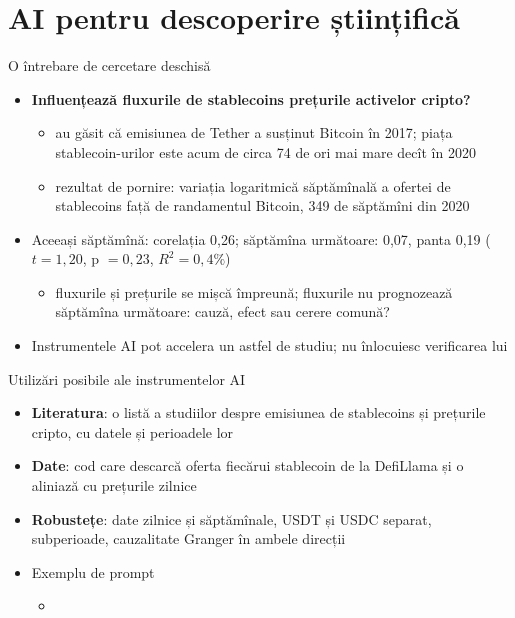 \section{AI pentru descoperire științifică}

\begin{frame}{O întrebare de cercetare deschisă}
\itemsize{\small}
\begin{itemize}
    \item \textbf{Influențează fluxurile de stablecoins prețurile activelor cripto?}
    \begin{itemize}
        \item {} au găsit că emisiunea de Tether a susținut Bitcoin în 2017; piața stablecoin-urilor este acum de circa 74 de ori mai mare decît în 2020
        \item rezultat de pornire: variația logaritmică săptămînală a ofertei de stablecoins față de randamentul Bitcoin, 349 de săptămîni din 2020
    \end{itemize}
    \item Aceeași săptămînă: corelația 0{,}26; săptămîna următoare: 0{,}07, panta 0{,}19 ($t = 1{,}20$, p $= 0{,}23$, $R^2 = 0{,}4\%$)
    \begin{itemize}
        \item fluxurile și prețurile se mișcă împreună; fluxurile nu prognozează săptămîna următoare: cauză, efect sau cerere comună?
    \end{itemize}
    \item Instrumentele AI pot accelera un astfel de studiu; nu înlocuiesc verificarea lui 
\end{itemize}
\end{frame}

\begin{frame}{Utilizări posibile ale instrumentelor AI}
\itemsize{\small}
\begin{itemize}
    \item \textbf{Literatura}: o listă a studiilor despre emisiunea de stablecoins și prețurile cripto, cu datele și perioadele lor
    \item \textbf{Date}: cod care descarcă oferta fiecărui stablecoin de la DefiLlama și o aliniază cu prețurile zilnice
    \item \textbf{Robustețe}: date zilnice și săptămînale, USDT și USDC separat, subperioade, cauzalitate Granger în ambele direcții
    \item Exemplu de prompt
    \begin{itemize}
        \item {}
    \end{itemize}
\end{itemize}
\end{frame}

